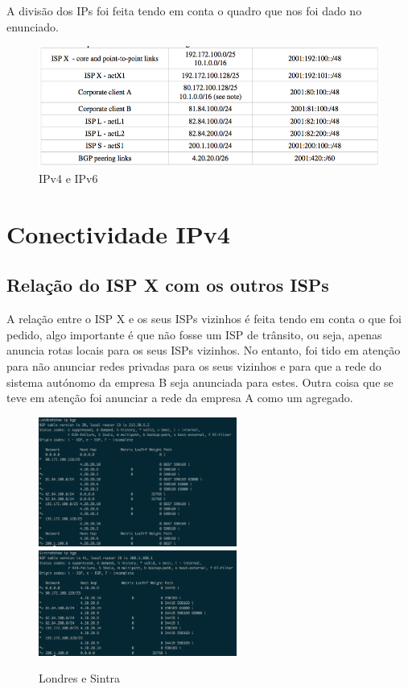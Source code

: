 \documentclass[pdftex,12pt,a4paper]{report}
\begin{document}
A divisão dos IPs foi feita tendo em conta o quadro que nos foi dado no enunciado.

\begin{figure}[!htb]
\center
 \includegraphics[width=150mm,scale=1]{imagens/devisaodeips.png}
 \caption{IPv4 e IPv6}
 \label{fig:mapadeips}
\end{figure}

\newpage

\section{Conectividade IPv4}

\subsection{Relação do ISP X com os outros ISPs}

A relação entre o ISP X e os seus ISPs vizinhos é feita tendo em conta o que foi pedido, algo importante é que não fosse um ISP de trânsito, ou seja, apenas anuncia rotas locais para os seus ISPs vizinhos. No entanto, foi tido em atenção para não anunciar redes privadas para os seus vizinhos e para que a rede do sistema autónomo da empresa B seja anunciada para estes. Outra coisa que se teve em atenção foi anunciar a rede da empresa A como um agregado.

\begin{figure}[!htb]
\center
 \includegraphics[width=65mm,scale=1]{imagens/showipbgp_london.png}
 \includegraphics[width=65mm,scale=1]{imagens/showipbgp_sintra.png}
 \caption{Londres e Sintra}
 \label{fig:mapadeips}
\end{figure}
\end{document}
